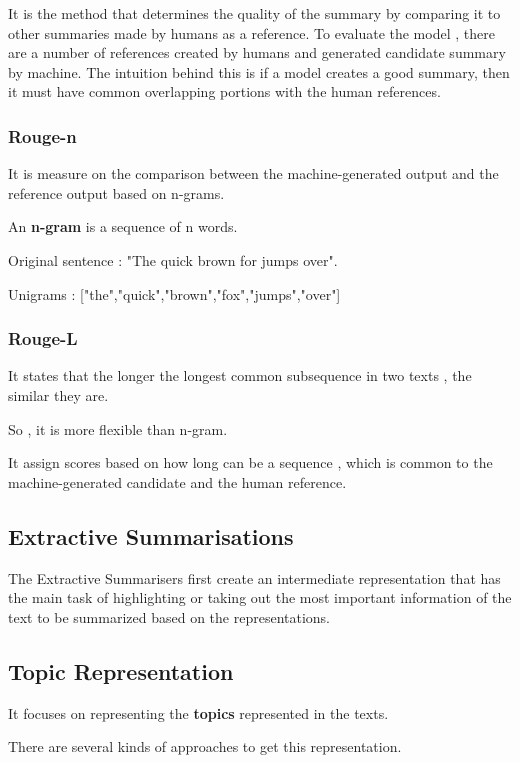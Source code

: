 \documentclass{article}
\begin{document}
It is the method that determines the quality of the summary by comparing it to other summaries made by humans as a reference.
To evaluate the model , there are a number of references created by humans and generated candidate summary by machine.
The intuition behind this is if a model creates a good summary, then it must have common overlapping portions with the human references.

\subsubsection{Rouge-n}

It is measure on the comparison between the machine-generated output and the reference output based on n-grams.

An \textbf{n-gram} is a sequence of n words.

Original sentence : "The quick brown for jumps over".

Unigrams : ["the","quick","brown","fox","jumps","over"]

\subsubsection{Rouge-L}

It states that the longer the longest common subsequence in two texts , the similar they are.

So , it is more flexible than n-gram.

It assign scores based on how long can be a sequence , which is common to the machine-generated candidate and the human reference.

\subsection{Extractive Summarisations}

The Extractive Summarisers first create an intermediate representation that has the main task of highlighting or taking out the most important information of the text to be summarized based on the representations.

\subsection{Topic Representation}

It focuses on representing the \textbf{topics} represented in the texts.

There are several kinds of approaches to get this representation.
\end{document}
